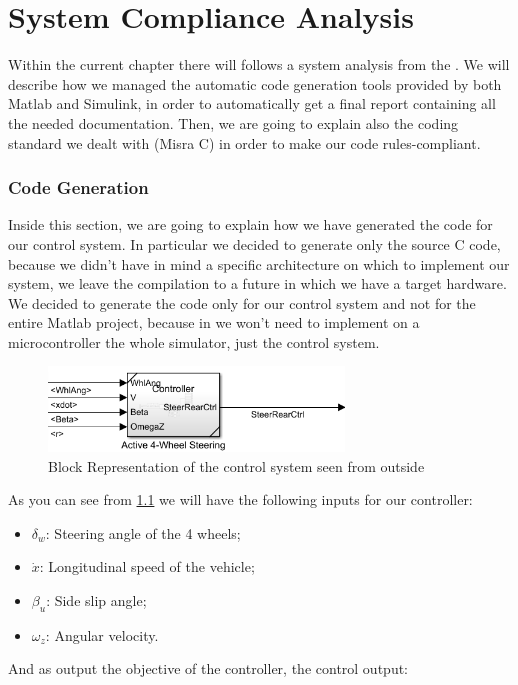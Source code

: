 
\chapter{System Compliance Analysis}
Within the current chapter there will follows a system analysis from the . We will describe how we managed the automatic code generation tools provided by both Matlab and Simulink, in order to automatically get a final report containing all the needed documentation. Then, we are going to explain also the coding standard we dealt with (Misra C) in order to make our code rules-compliant.
\subsection{Code Generation}
Inside this section, we are going to explain how we have generated the code for our control system. In particular we decided to generate only the source C code, because we didn't have in mind a specific architecture on which to implement our system, we leave the compilation to a future in which we have a target hardware. We decided to generate the code only for our control system and not for the entire Matlab project, because in we won't need to implement on a microcontroller the whole simulator, just the control system. 
\begin{figure} \label{Control Mask}
		\centering
		\includegraphics[width=0.7\textwidth]{Images/Simulator/ctrl-mask}
		\caption{Block Representation of the control system seen from outside}	
\end{figure}
As you can see from \ref{Control Mask} we will have the following inputs for our controller:
\begin{itemize}
\item $\delta_{w}$: Steering angle of the 4 wheels;
\item $\dot{x}$: Longitudinal speed of the vehicle;
\item $\beta_{u}$: Side slip angle;
\item $\omega_{z}$: Angular velocity.
\end{itemize}
And as output the objective of the controller, the control output:
